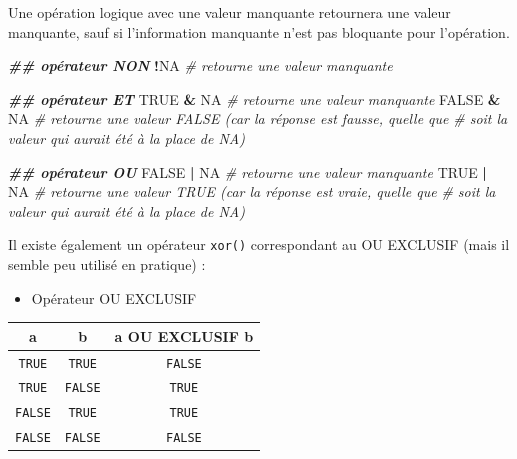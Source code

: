 \documentclass[
]{book}
\newenvironment{Shaded}{\begin{snugshade}}{\end{snugshade}}
\newcommand{\CommentTok}[1]{\textcolor[rgb]{0.56,0.35,0.01}{\textit{#1}}}
\newcommand{\ConstantTok}[1]{\textcolor[rgb]{0.56,0.35,0.01}{#1}}
\newcommand{\DocumentationTok}[1]{\textcolor[rgb]{0.56,0.35,0.01}{\textbf{\textit{#1}}}}
\newcommand{\SpecialCharTok}[1]{\textcolor[rgb]{0.81,0.36,0.00}{\textbf{#1}}}
\providecommand{\tightlist}{%
  \setlength{\itemsep}{0pt}\setlength{\parskip}{0pt}}
\begin{document}
Une opération logique avec une valeur manquante retournera une valeur manquante, sauf si l'information manquante n'est pas bloquante pour l'opération.

\begin{Shaded}
\begin{Highlighting}[]
\DocumentationTok{\#\# opérateur NON}
\SpecialCharTok{!}\ConstantTok{NA} \CommentTok{\# retourne une valeur manquante}

\DocumentationTok{\#\# opérateur ET}
\ConstantTok{TRUE} \SpecialCharTok{\&} \ConstantTok{NA} \CommentTok{\# retourne une valeur manquante}
\ConstantTok{FALSE} \SpecialCharTok{\&} \ConstantTok{NA} \CommentTok{\# retourne une valeur FALSE (car la réponse est fausse, quelle que }
           \CommentTok{\# soit la valeur qui aurait été à la place de NA)}

\DocumentationTok{\#\# opérateur OU}
\ConstantTok{FALSE} \SpecialCharTok{|} \ConstantTok{NA} \CommentTok{\# retourne une valeur manquante}
\ConstantTok{TRUE} \SpecialCharTok{|} \ConstantTok{NA} \CommentTok{\# retourne une valeur TRUE (car la réponse est vraie, quelle que }
           \CommentTok{\# soit la valeur qui aurait été à la place de NA)}
\end{Highlighting}
\end{Shaded}

Il existe également un opérateur \texttt{xor()} correspondant au OU EXCLUSIF (mais il semble peu utilisé en pratique) :

\begin{itemize}
\tightlist
\item
  Opérateur OU EXCLUSIF
\end{itemize}

\begin{longtable}[]{@{}ccc@{}}
\toprule\noalign{}
a & b & a OU EXCLUSIF b \\
\midrule\noalign{}
\endhead
\bottomrule\noalign{}
\endlastfoot
\texttt{TRUE} & \texttt{TRUE} & \texttt{FALSE} \\
\texttt{TRUE} & \texttt{FALSE} & \texttt{TRUE} \\
\texttt{FALSE} & \texttt{TRUE} & \texttt{TRUE} \\
\texttt{FALSE} & \texttt{FALSE} & \texttt{FALSE} \\
\end{longtable}
\end{document}
